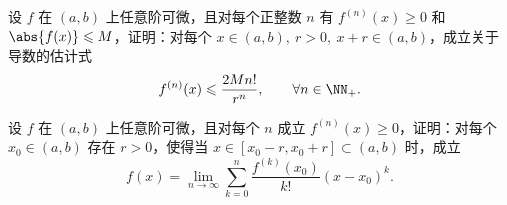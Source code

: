 \begin{xreferenceproblem}[18]
设 $f$ 在 $(a,b)$ 上任意阶可微，且对每个正整数 $n$ 有 $f^{(n)}(x)\geqslant0$ 和 $\abs{f(x)}\leqslant M$，证明：对每个 $x\in(a,b),\ r>0,\ x+r\in(a,b)$，成立关于导数的估计式
\[
  f^{(n)}(x)\leqslant\frac{2Mn!}{r^n},\qquad \forall n\in\NN_+.
\]
\end{xreferenceproblem}

\begin{xreferenceproblem}
设 $f$ 在 $(a,b)$ 上任意阶可微，且对每个 $n$ 成立 $f^{(n)}(x)\geqslant0$，证明：对每个 $x_0\in(a,b)$ 存在 $r>0$，使得当 $x\in[x_0-r,x_0+r]\subset(a,b)$ 时，成立
\[
  f(x)=\lim_{n\to\infty}\sum_{k=0}^n\frac{f^{(k)}(x_0)}{k!}(x-x_0)^k.
\]
\end{xreferenceproblem}
